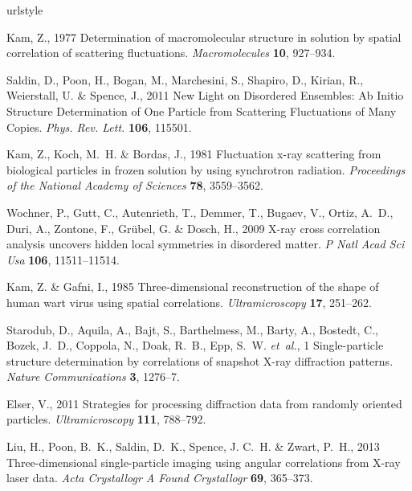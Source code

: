 \documentclass [11pt,fleqn]{article}
\begin{document}

%
%
%
%
\begin{thebibliography}{10}
\expandafter\ifx\csname urlstyle\endcsname\relax
  \providecommand{\doi}[1]{doi:\discretionary{}{}{}#1}\else
  \providecommand{\doi}{doi:\discretionary{}{}{}\begingroup
  \urlstyle{rm}\Url}\fi

Kam, Z., 1977 {Determination of macromolecular structure in solution by spatial
  correlation of scattering fluctuations}.
\newblock \emph{Macromolecules} \textbf{10}, 927--934.

Saldin, D., Poon, H., Bogan, M., Marchesini, S., Shapiro, D., Kirian, R.,
  Weierstall, U. \& Spence, J., 2011 {New Light on Disordered Ensembles: Ab
  Initio Structure Determination of One Particle from Scattering Fluctuations
  of Many Copies}.
\newblock \emph{Phys. Rev. Lett.} \textbf{106}, 115501.

Kam, Z., Koch, M.~H. \& Bordas, J., 1981 {Fluctuation x-ray scattering from
  biological particles in frozen solution by using synchrotron radiation.}
\newblock \emph{Proceedings of the National Academy of Sciences} \textbf{78},
  3559--3562.

Wochner, P., Gutt, C., Autenrieth, T., Demmer, T., Bugaev, V., Ortiz, A.~D.,
  Duri, A., Zontone, F., Gr{\"u}bel, G. \& Dosch, H., 2009 {X-ray cross
  correlation analysis uncovers hidden local symmetries in disordered matter.}
\newblock \emph{P Natl Acad Sci Usa} \textbf{106}, 11511--11514.

Kam, Z. \& Gafni, I., 1985 {Three-dimensional reconstruction of the shape of
  human wart virus using spatial correlations.}
\newblock \emph{Ultramicroscopy} \textbf{17}, 251--262.

Starodub, D., Aquila, A., Bajt, S., Barthelmess, M., Barty, A., Bostedt, C.,
  Bozek, J.~D., Coppola, N., Doak, R.~B., Epp, S.~W. \emph{et~al.}, 1
  {Single-particle structure determination by correlations of snapshot X-ray
  diffraction patterns}.
\newblock \emph{Nature Communications} \textbf{3}, 1276--7.

Elser, V., 2011 {Strategies for processing diffraction data from randomly
  oriented particles}.
\newblock \emph{Ultramicroscopy} \textbf{111}, 788--792.

Liu, H., Poon, B.~K., Saldin, D.~K., Spence, J. C.~H. \& Zwart, P.~H., 2013
  {Three-dimensional single-particle imaging using angular correlations from
  X-ray laser data}.
\newblock \emph{Acta Crystallogr A Found Crystallogr} \textbf{69}, 365--373.


\end{thebibliography}
\end{document}
